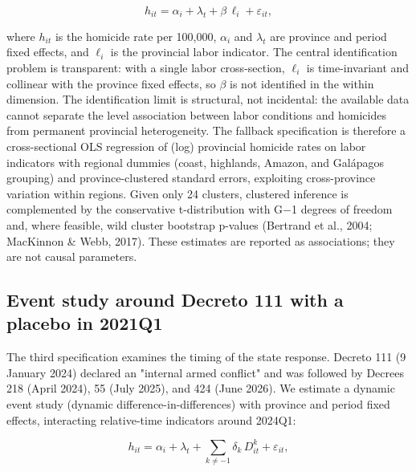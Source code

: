 $$ h_{it} = \alpha_i + \lambda_t + \beta \, \ell_i + \varepsilon_{it}, $$



where $h_{it}$ is the homicide rate per 100,000, $\alpha_i$ and $\lambda_t$ are province and period fixed effects, and $\ell_i$ is the provincial labor indicator. The central identification problem is transparent: with a single labor cross-section, $\ell_i$ is time-invariant and collinear with the province fixed effects, so $\beta$ is not identified in the within dimension. The identification limit is structural, not incidental: the available data cannot separate the level association between labor conditions and homicides from permanent provincial heterogeneity. The fallback specification is therefore a cross-sectional OLS regression of (log) provincial homicide rates on labor indicators with regional dummies (coast, highlands, Amazon, and Gal\'apagos grouping) and province-clustered standard errors, exploiting cross-province variation within regions. Given only 24 clusters, clustered inference is complemented by the conservative t-distribution with G$-$1 degrees of freedom and, where feasible, wild cluster bootstrap p-values (Bertrand et al., 2004; MacKinnon \& Webb, 2017). These estimates are reported as associations; they are not causal parameters.



\subsection{Event study around Decreto 111 with a placebo in 2021Q1}



The third specification examines the timing of the state response. Decreto 111 (9 January 2024) declared an "internal armed conflict" and was followed by Decrees 218 (April 2024), 55 (July 2025), and 424 (June 2026). We estimate a dynamic event study (dynamic difference-in-differences) with province and period fixed effects, interacting relative-time indicators around 2024Q1:



$$ h_{it} = \alpha_i + \lambda_t + \sum_{k \neq -1} \delta_k \, D^k_{it} + \varepsilon_{it}, $$



